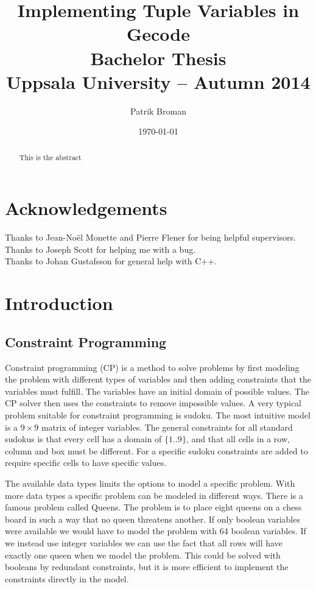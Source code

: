 \documentclass[a4paper,11pt]{article}
\title{\textbf{Implementing Tuple Variables in Gecode \\
	Bachelor Thesis \\
    Uppsala University -- Autumn 2014 \\
  }
}
\author{Patrik Broman}
\date{\today}
\begin{document}
\maketitle

\begin{abstract}
This is the abstract
\end{abstract}

\tableofcontents
\section{Acknowledgements}
Thanks to Jean-Noël Monette and Pierre Flener for being helpful supervisors. \\
Thanks to Joseph Scott for helping me with a bug. \\
Thanks to Johan Gustafsson for general help with C++. \\
\section{Introduction}
\subsection{Constraint Programming}

Constraint programming (CP) is a method to solve problems by first modeling the problem with different types of variables and then adding constraints that the variables must fulfill. The variables have an initial domain of possible values. The CP solver then uses the constraints to remove impossible values. A very typical problem suitable for constraint programming is sudoku. The most intuitive model is a $9\times9$ matrix of integer variables. The general constraints for all standard sudokus is that every cell has a domain of $\{1..9\}$, and that all cells in a row, column and box must be different. For a specific sudoku constraints are added to require specific cells to have specific values.

The available data types limits the options to model a specific problem. With more data types a specific problem can be modeled in different ways. There is a famous problem called Queens. The problem is to place eight queens on a chess board in such a way that no queen threatens another. If only boolean variables were available we would have to model the problem with 64 boolean variables. If we instead use integer variables we can use the fact that all rows will have exactly one queen when we model the problem. This could be solved with booleans by redundant constraints, but it is more efficient to implement the constraints directly in the model.
\end{document}
